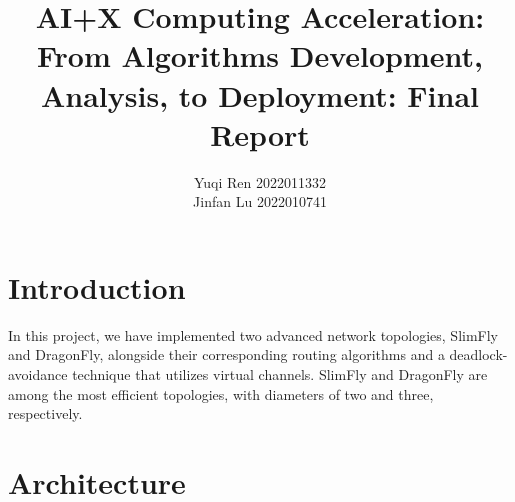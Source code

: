 \documentclass[utf8]{article}
\title{\bf\LARGE AI+X Computing Acceleration: From Algorithms Development, Analysis, to Deployment: Final Report}
\author{Yuqi Ren 2022011332 \\ Jinfan Lu 2022010741}
\date{}
\begin{document}
\maketitle
\thispagestyle{empty}

\section{Introduction}

In this project, we have implemented two advanced network topologies, SlimFly and DragonFly, alongside their corresponding routing algorithms and a deadlock-avoidance technique that utilizes virtual channels. SlimFly and DragonFly are among the most efficient topologies, with diameters of two and three, respectively.

\section{Architecture}
\end{document}

